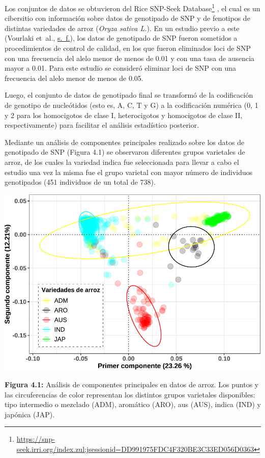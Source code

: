 \documentclass[11pt,spanish,a4paper,oneside,]{book} %
\renewcommand{\href}[2]{#2\footnote{\url{#1}}}
\let\rmarkdownfootnote\footnote%
\def\footnote{\protect\rmarkdownfootnote}
\renewcommand{\href}[2]{#2\footnote{\url{#1}}} %
\begin{document}
Los conjuntos de datos se obtuvieron del \href{https://snp-seek.irri.org/index.zul;jsessionid=DD991975FDC4F320BE3C33ED056D0363}{Rice SNP-Seek Database} , el cual es un cibersitio con información sobre datos de genotipado de SNP y de fenotipos de distintas variedades de arroz (\emph{Oryza sativa L.}). En un estudio previo a este (Vourlaki et~al., \protect\hyperlink{ref-cite:26}{s.~f.}), los datos de genotipado de SNP fueron sometidos a procedimientos de control de calidad, en los que fueron eliminados loci de SNP con una frecuencia del alelo menor de menos de 0.01 y con una tasa de ausencia mayor a 0.01. Para este estudio se consideró eliminar loci de SNP con una frecuencia del alelo menor de menos de 0.05.

Luego, el conjunto de datos de genotipado final se transformó de la codificación de genotipo de nucleótidos (esto es, A, C, T y G) a la codificación numérica (0, 1 y 2 para los homocigotos de clase I, heterocigotos y homocigotos de clase II, respectivamente) para facilitar el análisis estadístico posterior.

Mediante un análisis de componentes principales realizado sobre los datos de genotipado de SNP (Figura 4.1) se observaron diferentes grupos varietales de arroz, de los cuales la variedad indica fue seleccionada para llevar a cabo el estudio una vez la misma fue el grupo varietal con mayor número de individuos genotipados (451 individuos de un total de 738).

\begin{center}\includegraphics[width=1\linewidth]{figures/Graf_PCA} \end{center}

\begin{center}
\textbf{Figura 4.1:} Análisis de componentes principales en datos de arroz. Los puntos y las circuferencias de color representan los distintos grupos varietales disponibles: tipo intermedio o mezclado (ADM), aromático (ARO), aus (AUS), indica (IND) y japónica (JAP).

\end{center}
\end{document}
